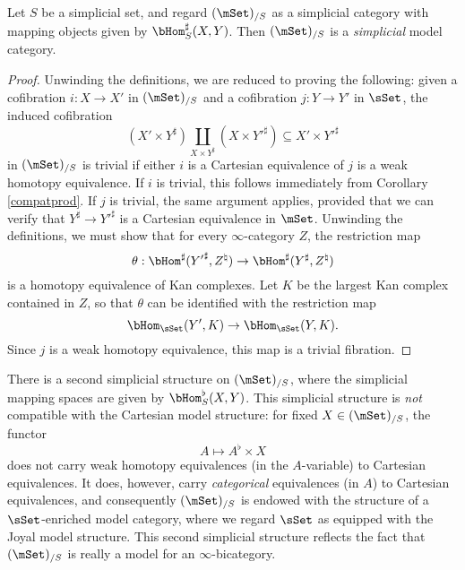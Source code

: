 \begin{corollary}
Let $S$ be a simplicial set, and regard $(\mSet)_{/S}$ as a simplicial category with mapping objects given by $\bHom^{\sharp}_{S}(X,Y)$. Then $(\mSet)_{/S}$ is a {\it simplicial} model category.
\end{corollary}

\begin{proof}
Unwinding the definitions, we are reduced to proving the following: given a cofibration
$i: X \rightarrow X'$ in $(\mSet)_{/S}$ and a cofibration $j: Y \rightarrow Y'$ in $\sSet$, the induced cofibration
$$ (X' \times Y^{\sharp}) \coprod_{ X \times Y^{\sharp} } (X \times {Y'}^{\sharp})
\subseteq X' \times {Y'}^{\sharp}$$
in $(\mSet)_{/S}$ is trivial if either $i$ is a Cartesian equivalence of $j$ is a weak homotopy equivalence. If $i$ is trivial, this follows immediately
from Corollary \ref{compatprod}. If $j$ is trivial, the same argument applies, provided that
we can verify that $Y^{\sharp} \rightarrow {Y'}^{\sharp}$ is a Cartesian equivalence in $\mSet$.
Unwinding the definitions, we must show that for every $\infty$-category $Z$, the restriction map
$$ \theta: \bHom^{\sharp}( {Y'}^{\sharp}, Z^{\natural} ) \rightarrow \bHom^{\sharp}( Y^{\sharp}, Z^{\natural}) $$
is a homotopy equivalence of Kan complexes. Let $K$ be the largest Kan complex contained in $Z$, so that $\theta$ can be identified with the restriction map
$$ \bHom_{\sSet}(Y', K) \rightarrow \bHom_{\sSet}(Y,K).$$
Since $j$ is a weak homotopy equivalence, this map is a trivial fibration.
\end{proof}

\begin{remark}
There is a second simplicial structure on $(\mSet)_{/S}$, where the simplicial mapping spaces are given by $\bHom_{S}^{\flat}(X,Y)$. This simplicial structure is {\em not} compatible with
the Cartesian model structure: for fixed $X \in (\mSet)_{/S}$, the functor
$$A \mapsto A^{\flat} \times X$$ does not carry weak homotopy equivalences (in the $A$-variable) to Cartesian equivalences. It does, however, carry {\em categorical} equivalences (in $A$) to Cartesian equivalences, and consequently $(\mSet)_{/S}$ is endowed with the structure of a $\sSet$-enriched model category, where we regard $\sSet$ as equipped with the Joyal model structure. This second simplicial structure reflects the fact that $(\mSet)_{/S}$ is really a model for an $\infty$-bicategory.
\end{remark}

